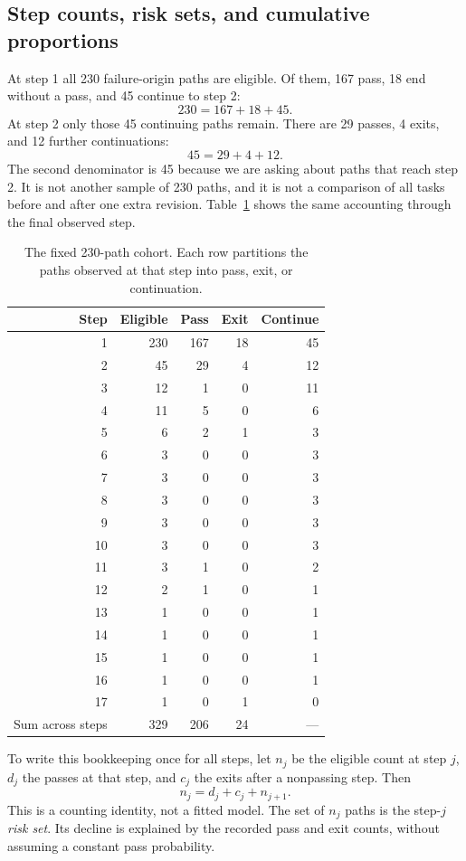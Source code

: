 \subsection{Step counts, risk sets, and cumulative proportions}
\label{subsec:risk-counts}
At step 1 all 230 failure-origin paths are eligible. Of them, 167 pass, 18 end without a pass, and 45 continue to step 2:
\[
230=167+18+45.
\]
At step 2 only those 45 continuing paths remain. There are 29 passes, 4 exits, and 12 further continuations:
\[
45=29+4+12.
\]
The second denominator is 45 because we are asking about paths that reach step 2. It is not another sample of 230 paths, and it is not a comparison of all tasks before and after one extra revision. Table~\ref{tab:process-counts} shows the same accounting through the final observed step.

\begin{table}[htbp]
\centering
\caption{The fixed 230-path cohort. Each row partitions the paths observed at that step into pass, exit, or continuation.}
\label{tab:process-counts}
\small
\begin{tabular}{rrrrr}
\toprule
Step & Eligible & Pass & Exit & Continue \\
\midrule
1 & 230 & 167 & 18 & 45 \\
2 & 45 & 29 & 4 & 12 \\
3 & 12 & 1 & 0 & 11 \\
4 & 11 & 5 & 0 & 6 \\
5 & 6 & 2 & 1 & 3 \\
6 & 3 & 0 & 0 & 3 \\
7 & 3 & 0 & 0 & 3 \\
8 & 3 & 0 & 0 & 3 \\
9 & 3 & 0 & 0 & 3 \\
10 & 3 & 0 & 0 & 3 \\
11 & 3 & 1 & 0 & 2 \\
12 & 2 & 1 & 0 & 1 \\
13 & 1 & 0 & 0 & 1 \\
14 & 1 & 0 & 0 & 1 \\
15 & 1 & 0 & 0 & 1 \\
16 & 1 & 0 & 0 & 1 \\
17 & 1 & 0 & 1 & 0 \\
\midrule
Sum across steps & 329 & 206 & 24 & --- \\
\bottomrule
\end{tabular}
\end{table}

To write this bookkeeping once for all steps, let $n_j$ be the eligible count at step $j$, $d_j$ the passes at that step, and $c_j$ the exits after a nonpassing step. Then
\begin{equation}
 n_j=d_j+c_j+n_{j+1}.
 \label{eq:cohort-conservation}
\end{equation}
This is a counting identity, not a fitted model. The set of $n_j$ paths is the step-$j$ \emph{risk set}. Its decline is explained by the recorded pass and exit counts, without assuming a constant pass probability.

